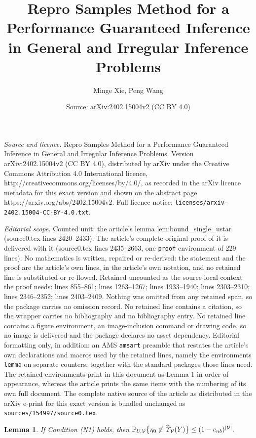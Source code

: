 \documentclass[10pt,a4paper]{amsart}
\title{\large Repro Samples Method for a Performance Guaranteed Inference in General and Irregular Inference Problems}
\author{Minge Xie, Peng Wang}
\date{Source: arXiv:2402.15004v2 (CC BY 4.0)}
\newtheorem{lemma}{Lemma}
\def\P{\mathbb P}
\begin{document}
\maketitle

\noindent\emph{Source and licence.} \large Repro Samples Method for a Performance Guaranteed Inference in General and Irregular Inference Problems. Version arXiv:2402.15004v2 (CC BY 4.0), distributed by arXiv under the Creative Commons Attribution 4.0 International licence, http://creativecommons.org/licenses/by/4.0/, as recorded in the arXiv licence metadata for this exact version and shown on the abstract page https://arxiv.org/abs/2402.15004v2. Full licence notice: \texttt{licenses/arxiv-2402.15004-CC-BY-4.0.txt}.\par\smallskip

\noindent\textit{Editorial scope.} Counted unit: the article's lemma lem:bound\_single\_ustar (source0.tex lines 2420--2433). The article's complete original proof of it is delivered with it (source0.tex lines 2435--2663, one \texttt{proof} environment of 229 lines). No mathematics is written, repaired or re-derived: the statement and the proof are the article's own lines, in the article's own notation, and no retained line is substituted or re-flowed.  Retained uncounted as the source-local context the proof needs: lines 855--861; lines 1263--1267; lines 1933--1940; lines 2303--2310; lines 2346--2352; lines 2403--2409.  Nothing was omitted from any retained span, so the package carries no omission record.  No retained line contains a citation, so the wrapper carries no bibliography and no bibliography entry.  No retained line contains a figure environment, an image-inclusion command or drawing code, so no image is delivered and the package declares no asset dependency.  Editorial formatting only, in addition: an AMS \texttt{amsart} preamble that restates the article's own declarations and macros used by the retained lines, namely the environments \texttt{lemma} on separate counters, together with the standard packages those lines need.  The retained environments print in this document as Lemma 1 in order of appearance, whereas the article prints the same items with the numbering of its own full document.  The complete native source of the article as distributed in the arXiv e-print for this exact version is bundled unchanged as \texttt{sources/154997/source0.tex}.
\begin{lemma}
\label{lemma:p_bound_C_D_general} 
If Condition (N1) holds, 
then $
    \P_{\*U, {\mathcal V}}\big\{\eta_0 \not\in \widehat{\it \Upsilon}_{{\mathcal V}}(\*Y)\big\} \leq (1-c_{nb})^{|{\mathcal V}|}.
$
\end{lemma}
\end{document}
